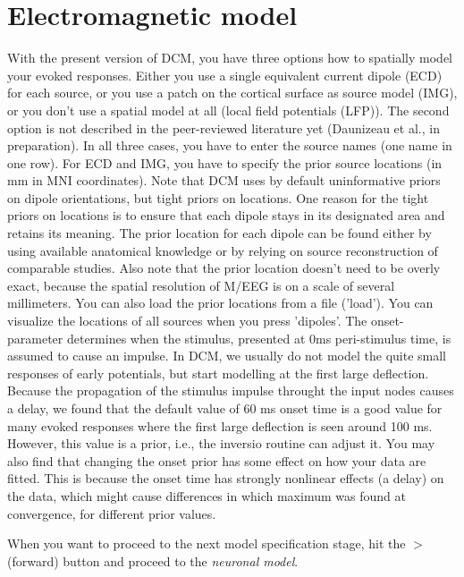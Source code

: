 \section{Electromagnetic model}
With the present version of DCM, you have three options how to spatially
model your evoked responses. Either you use a single equivalent
current dipole (ECD) for each source, or you use a patch on the
cortical surface as source model (IMG), or you don't use a spatial model at all (local field potentials (LFP)). The second option is not
described in the peer-reviewed literature yet (Daunizeau et al., in
preparation). In all three cases, you have to enter the source names (one
name in one row). For ECD and IMG, you have to specify the prior source locations (in mm in MNI
coordinates). Note that DCM uses by default uninformative priors on  
dipole orientations, but tight priors on locations. One reason for the
tight priors on locations is to ensure that each dipole stays in its
designated area and retains its meaning. The prior location for each
dipole can be found either by using available anatomical knowledge or
by relying on source reconstruction of comparable studies. Also note
that the prior location doesn't need to be overly exact, because the
spatial resolution of M/EEG is on a scale of several millimeters. 
You can also load the prior locations from a file
('load'). You can visualize the locations of all sources when you
press 'dipoles'. The onset-parameter determines when the stimulus,
presented at 0ms peri-stimulus time, is assumed to cause an
impulse. In DCM, we usually do not model the quite small responses of
early potentials, but start modelling at the first large
deflection. Because the propagation of the stimulus impulse throught
the input nodes causes a delay, we found that the default value of 60
ms onset time is a good value for many evoked responses where the
first large deflection is seen around 100 ms. However, this value is a
prior, i.e., the inversio routine can adjust it. You may also find
that changing the onset prior has some effect on how your data are
fitted. This is because the onset time has strongly nonlinear effects
(a delay) on the data, which might cause differences in which maximum
was found at convergence, for different prior values. 

When you want to proceed to the next model 
specification stage, hit the $>$ (forward) button and proceed
to the \textit{neuronal model}.

